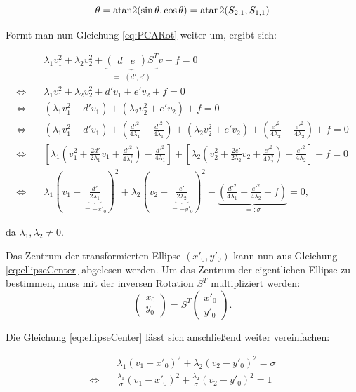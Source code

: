 \[
\theta = \text{atan2}(\sin\theta, \cos\theta) = \text{atan2}(S_{2,1}, S_{1,1})
\]

Formt man nun Gleichung \ref{eq:PCARot} weiter um, ergibt sich:

\begin{equation}\label{eq:ellipseCenter}
\begin{aligned}
&\lambda_1v_1^2 + \lambda_2v_2^2 + \underbrace{\begin{pmatrix}d & e\end{pmatrix}S^T}_{=:(d', e')}v + f = 0 \\
\Leftrightarrow\quad &\lambda_1v_1^2 + \lambda_2v_2^2 + d'v_1 + e'v_2 + f = 0 \\
\Leftrightarrow\quad &(\lambda_1v_1^2 + d'v_1)+ (\lambda_2v_2^2 + e'v_2) + f = 0\\
\Leftrightarrow\quad &(\lambda_1v_1^2 + d'v_1) + (\frac{d'^2}{4\lambda_1} - \frac{d'^2}{4\lambda_1}) + (\lambda_2v_2^2 + e'v_2) + (\frac{e'^2}{4\lambda_2} - \frac{e'^2}{4\lambda_2}) + f = 0 \\
\Leftrightarrow\quad &\left[\lambda_1\left(v_1^2 + \frac{2d'}{2\lambda_1}v_1 + \frac{d'^2}{4\lambda_1^2}\right) - \frac{d'^2}{4\lambda_1}\right] +\left[\lambda_2\left(v_2^2 + \frac{2e'}{2\lambda_2}v_2 + \frac{e'^2}{4\lambda_2^2}\right) - \frac{e'^2}{4\lambda_2}\right] + f = 0 \\
\Leftrightarrow\quad &\lambda_1(v_1 + \underbrace{\frac{d'}{2\lambda_1}}_{ = -x'_0})^2 +\lambda_2(v_2 + \underbrace{\frac{e'}{2\lambda_2}}_{ = -y'_0})^2 - \underbrace{\left(\frac{d'^2}{4\lambda_1} + \frac{e'^2}{4\lambda_2} - f\right)}_{=:\sigma} = 0,
\end{aligned}
\end{equation}

da $\lambda_1, \lambda_2 \neq 0$.

Das Zentrum der transformierten Ellipse $(x'_0, y'_0)$ kann nun aus Gleichung \ref{eq:ellipseCenter} abgelesen werden.
Um das Zentrum der eigentlichen Ellipse zu bestimmen, muss mit der inversen Rotation $S^T$ multipliziert werden:
\[
\begin{pmatrix} x_0 \\ y_0 \end{pmatrix} = S^T \begin{pmatrix} x'_0 \\ y'_0 \end{pmatrix}.
\]

Die Gleichung \ref{eq:ellipseCenter} lässt sich anschließend weiter vereinfachen:

\begin{equation} \label{eq:PCAKoeff}
\begin{aligned}
&\lambda_1(v_1 -x'_0)^2 +\lambda_2(v_2 -y'_0)^2 = \sigma \\
\Leftrightarrow\quad & \frac{\lambda_1}{\sigma}(v_1 -x'_0)^2 +\frac{\lambda_2}{\sigma}(v_2 -y'_0)^2  =1
\end{aligned}
\end{equation}

